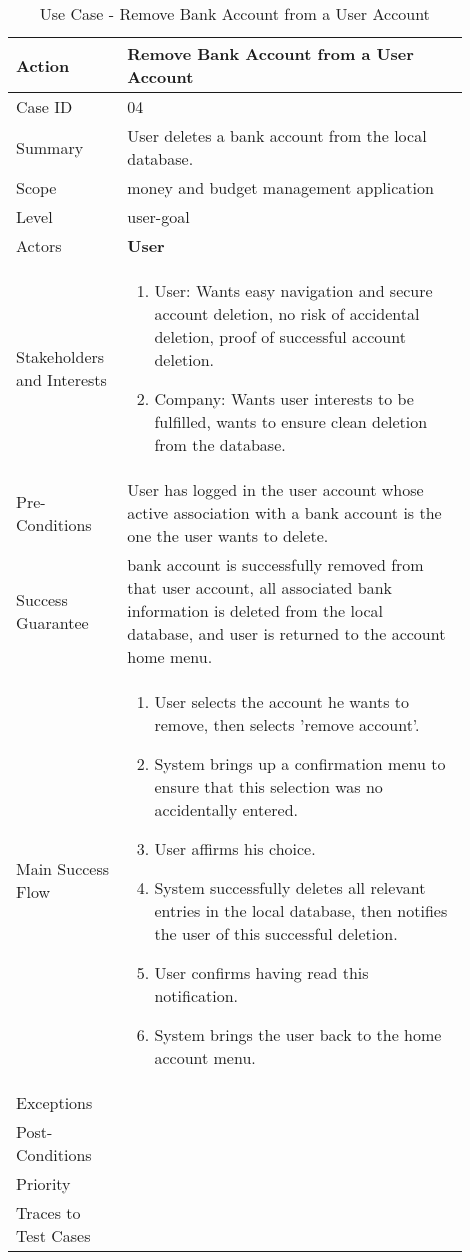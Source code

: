 \documentclass[11pt]{article}
\newcounter{use case ID}
\newcommand\tabularhead[1]{
\begin{table}[ht]
    \addtocounter{use case ID}{1}
    \caption{Use Case \arabic{use case ID} - #1}
    \vspace{0.2cm}
    \begin{tabular}{|p{0.2\linewidth}|p{0.70\linewidth}|}
    \hline
        \textbf{Action} & \textbf{#1} \\
        \hline}
\newcommand\addrow[2]{#1 & #2\\ \hline}
\newcommand\addmulrow[2]{ \begin{minipage}[t][][t]{2.5cm}#1\end{minipage}
        &\begin{minipage}[t][][t]{11cm}
        \begin{enumerate}[itemsep=-1ex] #2   \end{enumerate}
    \end{minipage}\vfill\\ \hline}
\newenvironment{usecase}{\tabularhead}
{\hline\end{tabular}\end{table}}
\begin{document}
\begin{usecase}{Remove Bank Account from a User Account}
    \addrow{Case ID}{04}
    \addrow{Summary}{User deletes a bank account from the local database.}
    \addrow{Scope}{money and budget management application}
    \addrow{Level}{user-goal}
    \addrow{Actors}{\textbf{User}}
    \addmulrow{Stakeholders and Interests}{
        \item User: Wants easy navigation and secure account deletion, no risk of accidental deletion, proof of successful account deletion.
        \item Company: Wants user interests to be fulfilled, wants to ensure clean deletion from the database. }
    \addrow{Pre-Conditions}{User has logged in the user account whose active association with a bank account is the one the user wants to delete.}
    \addrow{Success Guarantee}{bank account is successfully removed from that user account, all associated bank information is deleted from the local database, and user is returned to the account home menu.}
    \addmulrow{Main Success Flow}{
        \item User selects the account he wants to remove, then selects 'remove account'.
        \item System brings up a confirmation menu to ensure that this selection was no accidentally entered.
        \item User affirms his choice.
        \item System successfully deletes all relevant entries in the local database, then notifies the user of this successful deletion.
        \item User confirms having read this notification.
        \item System brings the user back to the home account menu.}
    \addrow{Exceptions}{}
    \addrow{Post-Conditions}{}
    \addrow{Priority}{}
    \addrow{Traces to Test Cases}{}
\end{usecase}
\end{document}
